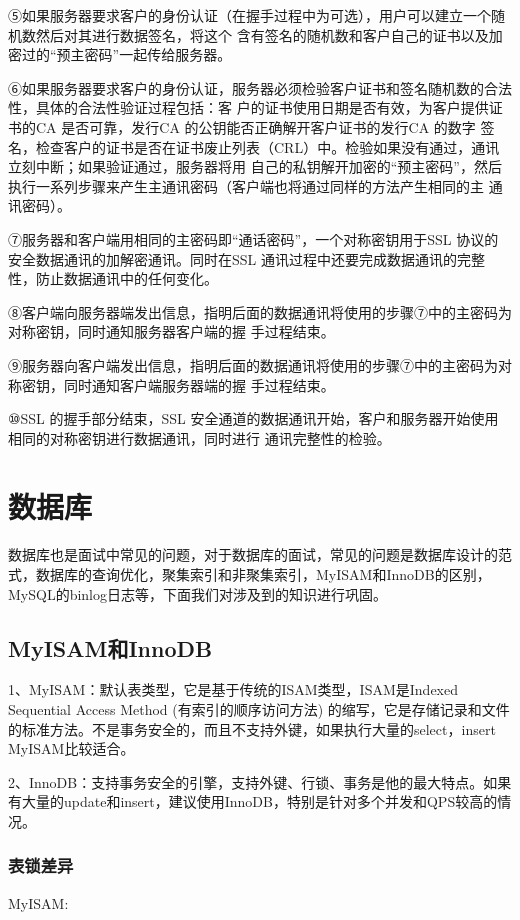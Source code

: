 \documentclass[UTF8]{ctexart}
\begin{document}
⑤如果服务器要求客户的身份认证（在握手过程中为可选），用户可以建立一个随机数然后对其进行数据签名，将这个
含有签名的随机数和客户自己的证书以及加密过的“预主密码”一起传给服务器。

⑥如果服务器要求客户的身份认证，服务器必须检验客户证书和签名随机数的合法性，具体的合法性验证过程包括：客
户的证书使用日期是否有效，为客户提供证书的CA 是否可靠，发行CA 的公钥能否正确解开客户证书的发行CA 的数字
签名，检查客户的证书是否在证书废止列表（CRL）中。检验如果没有通过，通讯立刻中断；如果验证通过，服务器将用
自己的私钥解开加密的“预主密码”，然后执行一系列步骤来产生主通讯密码（客户端也将通过同样的方法产生相同的主
通讯密码）。

⑦服务器和客户端用相同的主密码即“通话密码”，一个对称密钥用于SSL 协议的安全数据通讯的加解密通讯。同时在SSL
通讯过程中还要完成数据通讯的完整性，防止数据通讯中的任何变化。

⑧客户端向服务器端发出信息，指明后面的数据通讯将使用的步骤⑦中的主密码为对称密钥，同时通知服务器客户端的握
手过程结束。

⑨服务器向客户端发出信息，指明后面的数据通讯将使用的步骤⑦中的主密码为对称密钥，同时通知客户端服务器端的握
手过程结束。

⑩SSL 的握手部分结束，SSL 安全通道的数据通讯开始，客户和服务器开始使用相同的对称密钥进行数据通讯，同时进行
通讯完整性的检验。

\section{数据库}

数据库也是面试中常见的问题，对于数据库的面试，常见的问题是数据库设计的范式，数据库的查询优化，聚集索引和非聚集索引，MyISAM和InnoDB的区别，MySQL的binlog日志等，下面我们对涉及到的知识进行巩固。

\subsection{MyISAM和InnoDB}

1、MyISAM：默认表类型，它是基于传统的ISAM类型，ISAM是Indexed Sequential Access Method (有索引的顺序访问方法) 的缩写，它是存储记录和文件的标准方法。不是事务安全的，而且不支持外键，如果执行大量的select，insert MyISAM比较适合。

2、InnoDB：支持事务安全的引擎，支持外键、行锁、事务是他的最大特点。如果有大量的update和insert，建议使用InnoDB，特别是针对多个并发和QPS较高的情况。

\subsubsection{表锁差异}
MyISAM:
\end{document}

